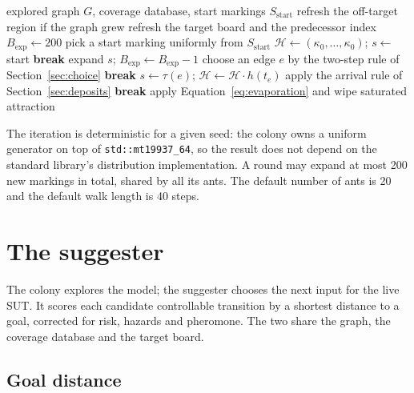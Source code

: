 \documentclass[11pt,a4paper]{article}
\newcommand{\TS}{\mathcal{H}}
\begin{document}
\begin{algorithm}[H]
\footnotesize
\caption{One colony iteration (defaults in brackets)}
\label{alg:iteration}
\begin{algorithmic}[1]
\Require explored graph $G$, coverage database, start markings $S_{\mathrm{start}}$
\State refresh the off-target region if the graph grew 
\State refresh the target board and the predecessor index
\State $B_{\mathrm{exp}}\gets 200$ 
  \State pick a start marking uniformly from $S_{\mathrm{start}}$
  \State $\TS\gets(\kappa_0,\dots,\kappa_0)$; $s\gets$ start
       \textbf{break} \EndIf
      \State expand $s$; $B_{\mathrm{exp}}\gets B_{\mathrm{exp}}-1$
    \EndIf
    \State choose an edge $e$ by the two-step rule of Section~\ref{sec:choice}
     \textbf{break} \EndIf
    \State $s\gets\tau(e)$; $\TS\gets\TS\cdot h(t_e)$
    \State apply the arrival rule of Section~\ref{sec:deposits}
     \textbf{break} \EndIf
  \EndFor
\EndFor
{}
  \State apply Equation~\eqref{eq:evaporation} and wipe saturated attraction
\EndIf
\end{algorithmic}
\end{algorithm}

The iteration is deterministic for a given seed: the colony owns a uniform
generator on top of \texttt{std::mt19937\_64}, so the result does not depend
on the standard library's distribution implementation.  A round may expand at
most 200 new markings in total, shared by all its ants.  The default number of
ants is 20 and the default walk length is 40 steps.

\section{The suggester}\label{sec:suggester}

The colony explores the model; the suggester chooses the next input for the
live SUT.  It scores each candidate controllable transition by a shortest
distance to a goal, corrected for risk, hazards and pheromone.  The two share
the graph, the coverage database and the target board.

\subsection{Goal distance}
\end{document}
